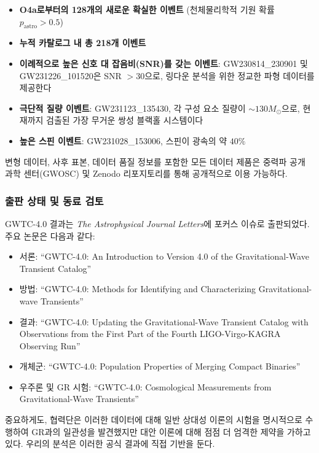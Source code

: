 \documentclass[11pt,a4paper]{article}
\theoremstyle{remark}
\begin{document}
	\begin{itemize}
		\item \textbf{O4a로부터의 128개의 새로운 확실한 이벤트} (천체물리학적 기원 확률 $p_{\text{astro}} > 0.5$)
		\item \textbf{누적 카탈로그 내 총 218개 이벤트}
		\item \textbf{이례적으로 높은 신호 대 잡음비(SNR)를 갖는 이벤트}: GW230814\_230901 및 GW231226\_101520은 SNR $> 30$으로, 링다운 분석을 위한 정교한 파형 데이터를 제공한다
		\item \textbf{극단적 질량 이벤트}: GW231123\_135430, 각 구성 요소 질량이 $\sim 130 M_\odot$으로, 현재까지 검출된 가장 무거운 쌍성 블랙홀 시스템이다
		\item \textbf{높은 스핀 이벤트}: GW231028\_153006, 스핀이 광속의 약 $40\%$
	\end{itemize}
	
	변형 데이터, 사후 표본, 데이터 품질 정보를 포함한 모든 데이터 제품은 중력파 공개 과학 센터(GWOSC) 및 Zenodo 리포지토리를 통해 공개적으로 이용 가능하다.
	
	\subsubsection{출판 상태 및 동료 검토}
	
	GWTC-4.0 결과는 \textit{The Astrophysical Journal Letters}에 포커스 이슈로 출판되었다. 주요 논문은 다음과 같다:
	
	\begin{itemize}
		\item 서론: ``GWTC-4.0: An Introduction to Version 4.0 of the Gravitational-Wave Transient Catalog''
		\item 방법: ``GWTC-4.0: Methods for Identifying and Characterizing Gravitational-wave Transients''
		\item 결과: ``GWTC-4.0: Updating the Gravitational-Wave Transient Catalog with Observations from the First Part of the Fourth LIGO-Virgo-KAGRA Observing Run''
		\item 개체군: ``GWTC-4.0: Population Properties of Merging Compact Binaries''
		\item 우주론 및 GR 시험: ``GWTC-4.0: Cosmological Measurements from Gravitational-Wave Transients''
	\end{itemize}
	
	중요하게도, 협력단은 이러한 데이터에 대해 일반 상대성 이론의 시험을 명시적으로 수행하여 GR과의 일관성을 발견했지만 대안 이론에 대해 점점 더 엄격한 제약을 가하고 있다. 우리의 분석은 이러한 공식 결과에 직접 기반을 둔다.
	
\end{document}
